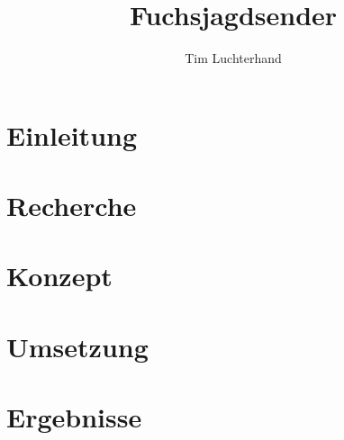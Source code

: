 \documentclass[DIN, pagenumber=false, fontsize=11pt, parskip=half]{scrartcl}
\title{Fuchsjagdsender}
\author{Tim Luchterhand}
\begin{document}
\maketitle
\section{Einleitung}

\section{Recherche}

\section{Konzept}

\section{Umsetzung}

\section{Ergebnisse}
\end{document}
